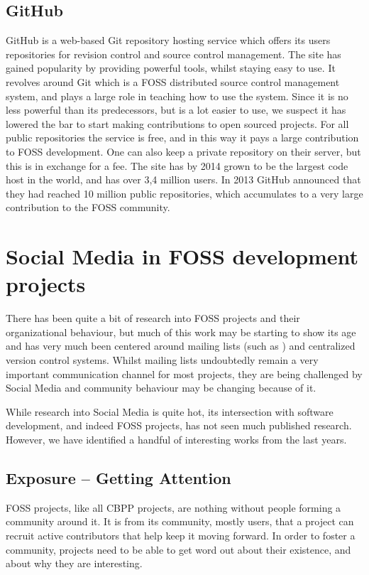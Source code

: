 \documentclass[a4paper,11pt]{article} %
\begin{document}

\subsection{GitHub}

GitHub is a web-based Git repository hosting service which offers its users
repositories for revision control and source control management. The site
has gained popularity by providing powerful tools, whilst staying easy to
use. It revolves around Git which is a FOSS distributed
source control management system, and plays a large role in teaching how to
use the system. Since it is no less powerful than its predecessors, but is a
lot easier to use, we suspect it has lowered the bar to start making
contributions to open sourced projects. For all public repositories the
service is free, and in this way it pays a large contribution to FOSS
development. One can also keep a private repository on their server, but
this is in exchange for a fee. The site has by 2014 grown to be the largest
code host in the world, and has over 3,4 million users. In 2013 GitHub
announced that they had reached 10 million public repositories, which
accumulates to a very large contribution to the FOSS community.

\section{Social Media in FOSS development projects}
There has been quite a bit of research into FOSS projects and their
organizational behaviour, but much of this work may be starting to show its
age and has very much been centered around mailing lists (such as
\cite{Oezbek10Cancer, singh2011network}) and centralized version control
systems. Whilst mailing lists undoubtedly remain a very important
communication channel for most projects, they are being challenged by Social
Media and community behaviour may be changing because of it.

While research into Social Media is quite hot, its intersection with
software development, and indeed FOSS projects, has not seen much
published research. However, we have identified a handful of
interesting works from the last years.

\subsection{Exposure -- Getting Attention}
FOSS projects, like all CBPP projects, are nothing without people
forming a community around it. It is from its community, mostly users,
that a project can recruit active contributors that help keep it
moving forward. In order to foster a community, projects need to be
able to get word out about their existence, and about why they are
interesting.
\end{document}
